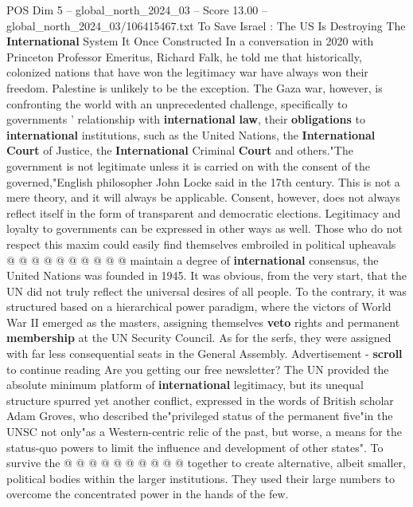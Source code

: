 \begin{textsample}{POS Dim 5 – global\_north\_2024\_03 – Score 13.00 – global\_north\_2024\_03/106415467.txt}  \label{ex:f5_pos_298}
To Save Israel : The US Is Destroying The \textbf{International} System It Once Constructed In a conversation in 2020 with Princeton Professor Emeritus, Richard Falk, he told me that historically, colonized nations that have won the legitimacy war have always won their freedom.
Palestine is unlikely to be the exception.
The Gaza war, however, is confronting the world with an unprecedented challenge, specifically to governments ' relationship with \textbf{international} \textbf{law}, their \textbf{obligations} to \textbf{international} institutions, such as the United Nations, the \textbf{International} \textbf{Court} of Justice, the \textbf{International} Criminal \textbf{Court} and others."The government is not legitimate unless it is carried on with the consent of the governed,"English philosopher John Locke said in the 17th century.
This is not a mere theory, and it will always be applicable.
Consent, however, does not always reflect itself in the form of transparent and democratic elections.
Legitimacy and loyalty to governments can be expressed in other ways as well.
Those who do not respect this maxim could easily find themselves embroiled in political upheavals @ @ @ @ @ @ @ @ @ @ maintain a degree of \textbf{international} consensus, the United Nations was founded in 1945.
It was obvious, from the very start, that the UN did not truly reflect the universal desires of all people.
To the contrary, it was structured based on a hierarchical power paradigm, where the victors of World War II emerged as the masters, assigning themselves \textbf{veto} rights and permanent \textbf{membership} at the UN Security Council.
As for the serfs, they were assigned with far less consequential seats in the General Assembly.
Advertisement - \textbf{scroll} to continue reading Are you getting our free newsletter?
The UN provided the absolute minimum platform of \textbf{international} legitimacy, but its unequal structure spurred yet another conflict, expressed in the words of British scholar Adam Groves, who described the"privileged status of the permanent five"in the UNSC not only"as a Western-centric relic of the past, but worse, a means for the status-quo powers to limit the influence and development of other states".
To survive the @ @ @ @ @ @ @ @ @ @ together to create alternative, albeit smaller, political bodies within the larger institutions.
They used their large numbers to overcome the concentrated power in the hands of the few.

\end{textsample}
